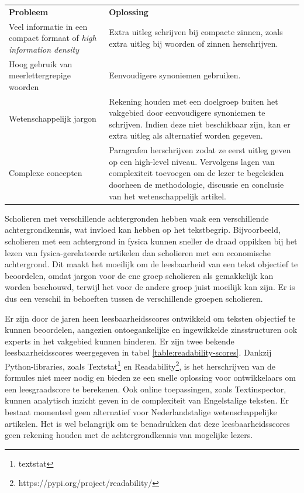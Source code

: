 
\medspace

\begin{center}
	\begin{tabular}{| m{4cm} | m{10cm} |}
		\hline
		\textbf{Probleem} & \textbf{Oplossing} \\
		Veel informatie in een compact formaat of \textit{high information density} & Extra uitleg schrijven bij compacte zinnen, zoals extra uitleg bij woorden of zinnen herschrijven. \\
		\hline
		Hoog gebruik van meerlettergrepige woorden & Eenvoudigere synoniemen gebruiken. \\
		\hline
		Wetenschappelijk jargon & Rekening houden met een doelgroep buiten het vakgebied door eenvoudigere synoniemen te schrijven. Indien deze niet beschikbaar zijn, kan er extra uitleg als alternatief worden gegeven. \\
		\hline
		Complexe concepten & Paragrafen herschrijven zodat ze eerst uitleg geven op een high-level niveau. Vervolgens lagen van complexiteit toevoegen om de lezer te begeleiden doorheen de methodologie, discussie en conclusie van het wetenschappelijk artikel. \\ 
		\hline
	\end{tabular}
\end{center}

\medspace

Scholieren met verschillende achtergronden hebben vaak een verschillende achtergrondkennis, wat invloed kan hebben op het tekstbegrip. Bijvoorbeeld, scholieren met een achtergrond in fysica kunnen sneller de draad oppikken bij het lezen van fysica-gerelateerde artikelen dan scholieren met een economische achtergrond. Dit maakt het moeilijk om de leesbaarheid van een tekst objectief te beoordelen, omdat jargon voor de ene groep scholieren als gemakkelijk kan worden beschouwd, terwijl het voor de andere groep juist moeilijk kan zijn. Er is dus een verschil in behoeften tussen de verschillende groepen scholieren.

\medspace

Er zijn door de jaren heen leesbaarheidsscores ontwikkeld om teksten objectief te kunnen beoordelen, aangezien ontoegankelijke en ingewikkelde zinsstructuren ook experts in het vakgebied kunnen hinderen. Er zijn twee bekende leesbaarheidsscores weergegeven in tabel \ref{table:readability-scores}. Dankzij Python-libraries, zoals Textstat\footnote{textstat} en Readability\footnote{https://pypi.org/project/readability/}, is het herschrijven van de formules niet meer nodig en bieden ze een snelle oplossing voor ontwikkelaars om een leesgraadscore te berekenen. Ook online toepassingen, zoals Textinspector, kunnen analytisch inzicht geven in de complexiteit van Engelstalige teksten. Er bestaat momenteel geen alternatief voor Nederlandstalige wetenschappelijke artikelen. Het is wel belangrijk om te benadrukken dat deze leesbaarheidsscores geen rekening houden met de achtergrondkennis van mogelijke lezers.

